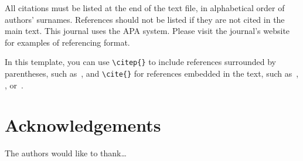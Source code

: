 \documentclass{article}
\begin{document}
All citations must be listed at the end of the text file,
in alphabetical order of authors' surnames.
References should not be listed if they are not cited in
the main text.
This journal uses the APA system.
Please visit the journal's website
for examples of referencing format.

In this template, you can use \verb=\citep{}= to include references
surrounded by parentheses, such as~\citep{KneesS16_MusicSimilarityRetrieval_SPRINGER}, and \verb=\cite{}=
for references embedded in the text,
such as~\cite{WeihsJVR16_MusicDataAnalysis_CRC},
\cite{SerraEtAl13_RoadmapMIR_CreativeCommon},
or~\cite{Mueller15_FMP_SPRINGER}.


\theendnotes{}

\section*{Acknowledgements}

The authors would like to thank\dots




%
%
%
%
\end{document}

